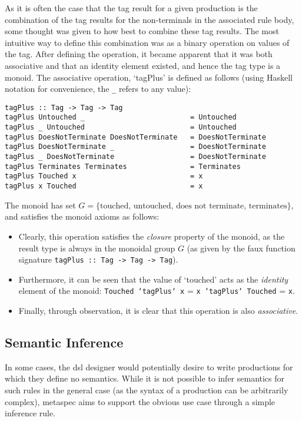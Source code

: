 As it is often the case that the tag result for a given production is the combination of the tag results for the non-terminals in the associated rule body, some thought was given to how best to combine these tag results.
The most intuitive way to define this combination was as a binary operation on values of the tag. 
After defining the operation, it became apparent that it was both associative and that an identity element existed, and hence the tag type is a \gls{monoid}.
The associative operation, `tagPlus' is defined as follows (using Haskell notation for convenience, the \texttt{_} refers to any value):
\begin{verbatim}
tagPlus :: Tag -> Tag -> Tag
tagPlus Untouched _                         = Untouched
tagPlus _ Untouched                         = Untouched
tagPlus DoesNotTerminate DoesNotTerminate   = DoesNotTerminate
tagPlus DoesNotTerminate _                  = DoesNotTerminate
tagPlus _ DoesNotTerminate                  = DoesNotTerminate
tagPlus Terminates Terminates               = Terminates
tagPlus Touched x                           = x
tagPlus x Touched                           = x
\end{verbatim}

The monoid has set $G = \{\text{touched, untouched, does not terminate, terminates}\}$, and satisfies the monoid axioms as follows:
\begin{itemize}
    \item Clearly, this operation satisfies the \textit{closure} property of the monoid, as the result type is always in the monoidal group $G$ (as given by the faux function signature \texttt{tagPlus :: Tag -> Tag -> Tag}).
    \item Furthermore, it can be seen that the value of `touched' acts as the \textit{identity} element of the monoid: \texttt{Touched `tagPlus` x} = \texttt{x `tagPlus` Touched} = \texttt{x}.
    \item Finally, through observation, it is clear that this operation is also \textit{associative}.
\end{itemize}



\subsection{Semantic Inference} %
\label{sub:semantic_inference}
In some cases, the \gls{dsl} designer would potentially desire to write productions for which they define no semantics. 
While it is not possible to infer semantics for such rules in the general case (as the syntax of a production can be arbitrarily complex), \gls{metaspec} aims to support the obvious use case through a simple inference rule. \\

